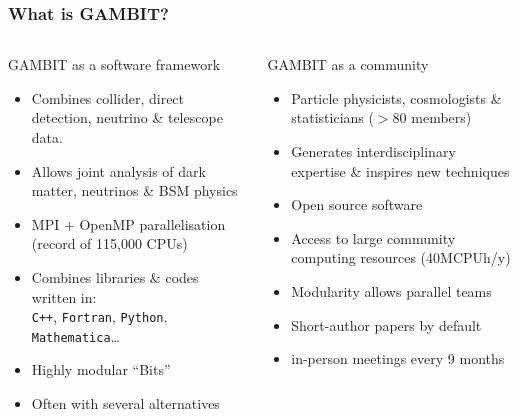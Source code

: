 \documentclass[aspectratio=169]{beamer}
\begin{document}
\begin{frame}
    \frametitle{What is GAMBIT?}
    \vspace{-10pt}
    \begin{columns}[t]
        \begin{block}{GAMBIT as a software framework}
            \begin{itemize}
                \item Combines collider, direct detection, neutrino \& telescope data.
                \item Allows joint analysis of dark matter, neutrinos \& BSM physics
                \item MPI + OpenMP parallelisation \\(record of 115,000 CPUs)
                \item Combines libraries \& codes written in:\\
                    \texttt{C++}, \texttt{Fortran}, \texttt{Python}, \texttt{Mathematica}\ldots
                \item Highly modular ``Bits''
                \item Often with several alternatives
            \end{itemize}
        \end{block}
        \begin{block}{GAMBIT as a community}
            \begin{itemize}
                \item Particle physicists, cosmologists \& statisticians ($>$80 members)
                \item Generates interdisciplinary expertise \& inspires new techniques
                \item Open source software
                \item Access to large community computing resources (40MCPUh/y)
                \item Modularity allows parallel teams
                \item Short-author papers by default
                \item in-person meetings every 9 months
            \end{itemize}
        \end{block}
    \end{columns}





\end{frame}
\end{document}
